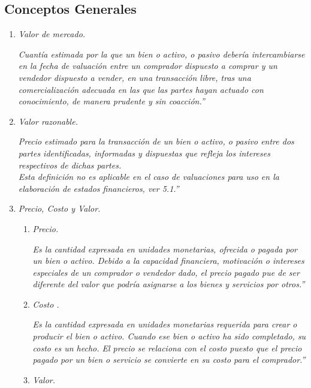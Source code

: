 \subsection{Conceptos Generales}
\begin{enumerate}
\item \textcolor{principal}{\textit{Valor de mercado. }}

\textit{Cuant\'ia estimada por la que un bien o activo, o pasivo deber\'ia intercambiarse en la fecha de valuaci\'on entre un comprador dispuesto a comprar y un vendedor dispuesto a vender, en una transacci\'on libre, tras una comercializaci\'on adecuada en las que las partes hayan actuado con conocimiento, de manera prudente y sin coacci\'on.''}

\item \textcolor{principal}{\textit{Valor razonable.} }

\textit{Precio estimado para la transacci\'on de un bien o activo, o pasivo entre dos partes identificadas, informadas y dispuestas que refleja los intereses respectivos de dichas partes. }\\

\textit{Esta definici\'on no es aplicable en el caso de valuaciones para uso en la elaboraci\'on de estados financieros, ver 5.1.''}

\item  \textcolor{principal}{\textit{Precio, Costo y Valor. }}

\begin{enumerate}
\item \textcolor{principal}{\textit{Precio. }}

\textit{Es la cantidad expresada en unidades monetarias, ofrecida o pagada por un bien o activo. Debido a la capacidad financiera, motivaci\'on o intereses especiales de un comprador o vendedor dado, el precio pagado pue de ser diferente del valor que podr\'ia asignarse a los bienes y servicios por otros.''}

\item  \textcolor{principal}{\textit{Costo .}}

\textit{Es la cantidad expresada en unidades monetarias requerida para crear o producir el bien o activo. Cuando ese bien o activo ha sido completado, su costo es un hecho. El precio se relaciona con el costo puesto que el precio pagado por un bien o servicio se convierte en su costo para el comprador.''}

\item \textcolor{principal}{ \textit{Valor. }}


\end{enumerate}
\end{enumerate}
